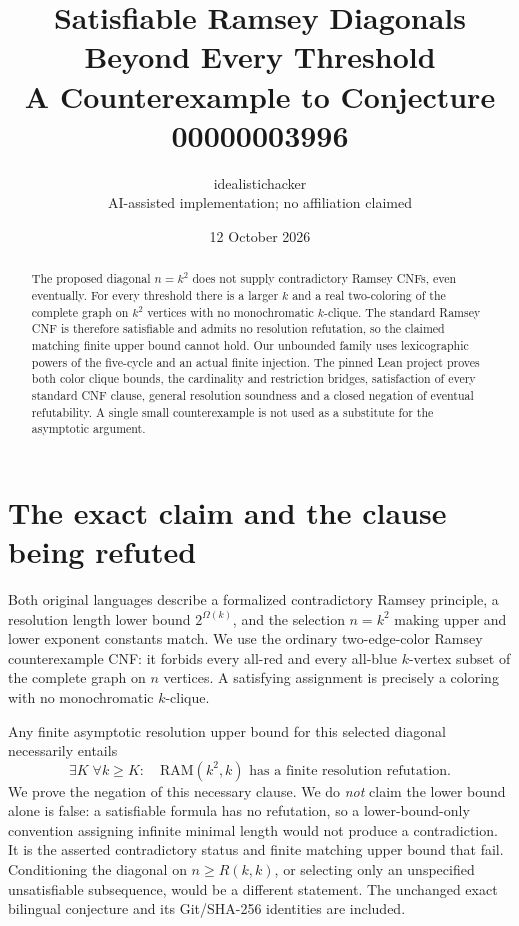 \documentclass[10pt,a4paper]{article}
\title{Satisfiable Ramsey Diagonals Beyond Every Threshold\\A Counterexample to Conjecture 00000003996}
\author{idealistichacker\\\small AI-assisted implementation; no affiliation claimed}
\date{12 October 2026}
\begin{document}
\maketitle
\begin{abstract}
The proposed diagonal $n=k^2$ does not supply contradictory Ramsey CNFs, even eventually.
For every threshold there is a larger $k$ and a real two-coloring of the complete graph on
$k^2$ vertices with no monochromatic $k$-clique. The standard Ramsey CNF is therefore
satisfiable and admits no resolution refutation, so the claimed matching finite upper bound
cannot hold. Our unbounded family uses lexicographic powers of the five-cycle and an actual
finite injection. The pinned Lean project proves both color clique bounds, the cardinality
and restriction bridges, satisfaction of every standard CNF clause, general resolution
soundness and a closed negation of eventual refutability. A single small counterexample is
not used as a substitute for the asymptotic argument.
\end{abstract}

\section{The exact claim and the clause being refuted}
Both original languages describe a formalized contradictory Ramsey principle, a resolution
length lower bound $2^{\Omega(k)}$, and the selection $n=k^2$ making upper and lower exponent
constants match. We use the ordinary two-edge-color Ramsey counterexample CNF: it forbids
every all-red and every all-blue $k$-vertex subset of the complete graph on $n$ vertices.
A satisfying assignment is precisely a coloring with no monochromatic $k$-clique.

Any finite asymptotic resolution upper bound for this selected diagonal necessarily entails
\begin{equation}\label{eq:necessary}
 \exists K\;\forall k\ge K:\quad \mathrm{RAM}(k^2,k)
 \text{ has a finite resolution refutation}.
\end{equation}
We prove the negation of this necessary clause. We do \emph{not} claim the lower bound alone
is false: a satisfiable formula has no refutation, so a lower-bound-only convention assigning
infinite minimal length would not produce a contradiction. It is the asserted contradictory
status and finite matching upper bound that fail. Conditioning the diagonal on $n\ge R(k,k)$,
or selecting only an unspecified unsatisfiable subsequence, would be a different statement.
The unchanged exact bilingual conjecture and its Git/SHA-256 identities are included.
\end{document}
